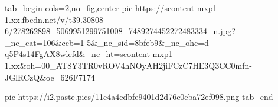  
 
 
 
 

\ifcmt
  tab_begin cols=2,no_fig,center
     pic https://scontent-mxp1-1.xx.fbcdn.net/v/t39.30808-6/278262898_5069951299751008_7489274452272483334_n.jpg?_nc_cat=106&ccb=1-5&_nc_sid=8bfeb9&_nc_ohc=d-q5P4s14FgAX8wlefd&_nc_ht=scontent-mxp1-1.xx&oh=00_AT8Y3TR0vROV4hNOyAH2jiFCzC7HE3Q3CC0mfn-JGlRCzQ&oe=626F7174

		 pic https://i2.paste.pics/11e4a4edbfe9401d2d76c0eba72ef098.png
  tab_end
\fi
